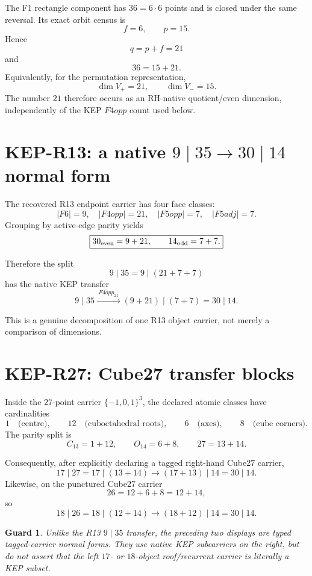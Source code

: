 \documentclass[11pt,a4paper]{article}
\newtheorem{guard}[definition]{Guard}
\begin{document}
The F1 rectangle component has \(36=6\cdot6\) points and is closed under
the same reversal.  Its exact orbit census is
\[
f=6,\qquad p=15.
\]
Hence
\[
q=p+f=21
\]
and
\[
\boxed{36=15+21.}
\]
Equivalently, for the permutation representation,
\[
\dim V_+=21,\qquad \dim V_-=15.
\]
The number \(21\) therefore occurs as an RH-native quotient/even
dimension, independently of the KEP \(F4opp\) count used below.

\section{KEP-R13: a native \(9\mid35\to30\mid14\) normal form}

The recovered R13 endpoint carrier has four face classes:
\[
|F6|=9,\quad |F4opp|=21,\quad |F5opp|=7,\quad |F5adj|=7.
\]
Grouping by active-edge parity yields
\[
\boxed{
30_{\rm even}=9+21,\qquad
14_{\rm odd}=7+7.
}
\]

Therefore the split
\[
9\mid35
=
9\mid(21+7+7)
\]
has the native KEP transfer
\[
\boxed{
9\mid35
\xrightarrow{\;F4opp_{21}\;}
(9+21)\mid(7+7)
=
30\mid14.
}
\]

This is a genuine decomposition of one R13 object carrier, not merely a
comparison of dimensions.

\section{KEP-R27: Cube27 transfer blocks}

Inside the \(27\)-point carrier \(\{-1,0,1\}^3\), the declared atomic
classes have cardinalities
\[
\boxed{
1\quad\text{(centre)},\qquad
12\quad\text{(cuboctahedral roots)},\qquad
6\quad\text{(axes)},\qquad
8\quad\text{(cube corners)}.
}
\]
The parity split is
\[
\boxed{
C_{13}=1+12,\qquad O_{14}=6+8,\qquad27=13+14.
}
\]

Consequently, after explicitly declaring a tagged right-hand Cube27
carrier,
\[
\boxed{
17\mid27
=
17\mid(13+14)
\longrightarrow
(17+13)\mid14
=
30\mid14.
}
\]
Likewise, on the punctured Cube27 carrier
\[
26=12+6+8=12+14,
\]
so
\[
\boxed{
18\mid26
=
18\mid(12+14)
\longrightarrow
(18+12)\mid14
=
30\mid14.
}
\]

\begin{guard}
Unlike the R13 \(9\mid35\) transfer, the preceding two displays are
typed tagged-carrier normal forms.  They use native KEP subcarriers on
the right, but do not assert that the left \(17\)- or \(18\)-object
roof/recurrent carrier is literally a KEP subset.
\end{guard}
\end{document}
